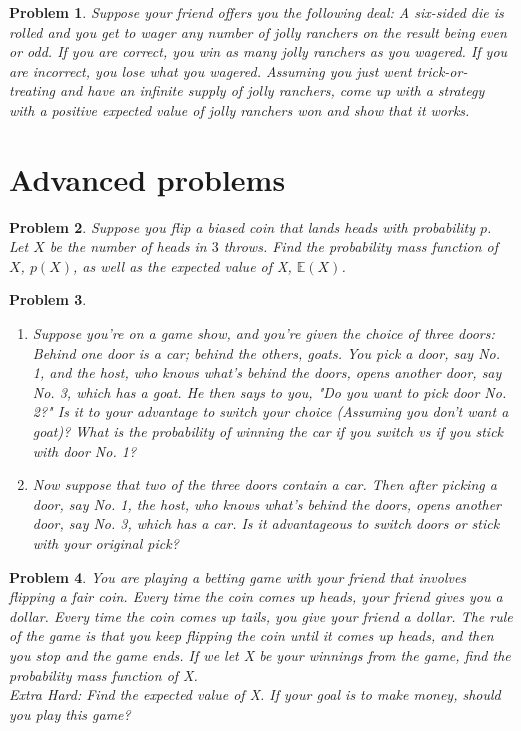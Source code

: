 \documentclass[a4paper,12pt]{article}
\theoremstyle{perfect}
\newtheorem{prb}{Problem}
\newcommand{\EE}{\mathbb{E}}
\begin{document}
\begin{prb}
Suppose your friend offers you the following deal: A six-sided die is rolled and you get to wager any number of jolly ranchers on the result being even or odd. If you are correct, you win as many jolly ranchers as you wagered. If you are incorrect, you lose what you wagered. Assuming you just went trick-or-treating and have an infinite supply of jolly ranchers, come up with a strategy with a positive expected value of jolly ranchers won and show that it works. 
\end{prb}



\section{Advanced problems}


\begin{prb}
Suppose you flip a biased coin that lands heads with probability $p$. Let $X$ be the number of heads in $3$ throws. Find the probability mass function of $X$, $p(X)$, as well as the expected value of X, $\EE(X)$.
\end{prb}
 
 \begin{prb} 
 \begin{enumerate}
 \item Suppose you're on a game show, and you're given the choice of three doors: Behind one door is a car; behind the others, goats. You pick a door, say No. 1, and the host, who knows what's behind the doors, opens another door, say No. 3, which has a goat. He then says to you, "Do you want to pick door No. 2?" Is it to your advantage to switch your choice (Assuming you don't want a goat)? What is the probability of winning the car if you switch vs if you stick with door No. 1?
 
 \item Now suppose that two of the three doors contain a car. Then after picking a door, say No. 1, the host, who knows what's behind the doors, opens another door, say No. 3, which has a car. Is it advantageous to switch doors or stick with your original pick?
 \end{enumerate}
 \end{prb}

\begin{prb}
You are playing a betting game with your friend that involves flipping a fair coin. Every time the coin comes up heads, your friend gives you a dollar. Every time the coin comes up tails, you give your friend a dollar. The rule of the game is that you keep flipping the coin until it comes up heads, and then you stop and the game ends. If we let X be your winnings from the game, find the probability mass function of X. \\

Extra Hard: Find the expected value of X. If your goal is to make money, should you play this game?
\end{prb}
\end{document}
